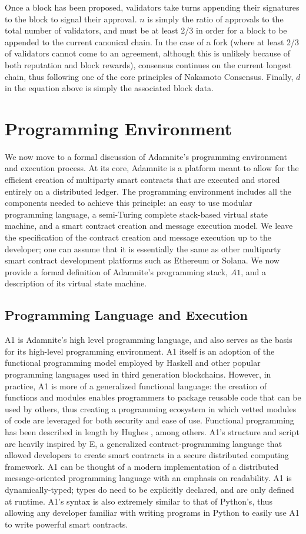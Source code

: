 \documentclass[conference]{IEEEtran}
\begin{document}
Once a block has been proposed, validators take turns appending their signatures to the block to signal their approval. $n$ is simply the ratio of approvals to the total number of validators, and must be at least 2/3 in order for a block to be appended to the current canonical chain. In the case of a fork (where at least 2/3 of validators cannot come to an agreement, although this is unlikely because of both reputation and block rewards), consensus continues on the current longest chain, thus following one of the core principles of Nakamoto Consensus.  Finally, $d$ in the equation above is simply the associated block data.

\section{Programming Environment}

We now move to a formal discussion of Adamnite's programming environment and execution process. At its core, Adamnite is a platform meant to allow for the efficient creation of multiparty smart contracts that are executed and stored entirely on a distributed ledger. The programming environment includes all the components needed to achieve this principle: an easy to use modular programming language, a semi-Turing complete stack-based virtual state machine, and a smart contract creation and message execution model. We leave the specification of the contract creation and message execution up to the developer; one can assume that it is essentially the same as other multiparty smart contract development platforms such as Ethereum or Solana. We now provide a formal definition of Adamnite's programming stack, $A1$, and a description of its virtual state machine. 

\subsection{Programming Language and Execution}
A1 is Adamnite's high level programming language, and also serves as the basis for its high-level programming environment. A1 itself is an adoption of the functional programming model employed by Haskell and other popular programming languages used in third generation blockchains. However, in practice, A1 is more of a generalized functional language: the creation of functions and modules enables programmers to package reusable code that can be used by others, thus creating a programming ecosystem in which vetted modules of code are leveraged for both security and ease of use. Functional programming has been described in length by Hughes \cite{hughesFunctional}, among others. A1's structure and script are heavily inspired by E, a generalized contract-programming language that allowed developers to create smart contracts in a secure distributed computing framework. A1 can be thought of a modern implementation of a distributed message-oriented programming language with an emphasis on readability. A1 is dynamically-typed; types do need to be explicitly declared, and are only defined at runtime. A1's syntax is also extremely similar to that of Python's, thus allowing any developer familiar with writing programs in Python to easily use A1 to write powerful smart contracts.  \\
\end{document}
